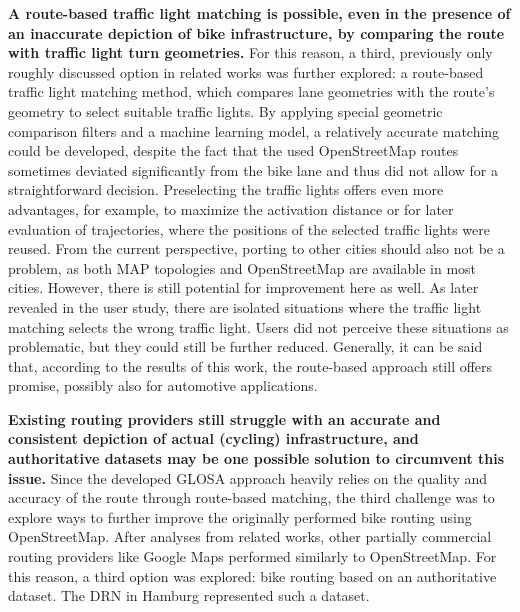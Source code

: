 \textbf{\color{cidarkblue}A route-based traffic light matching is possible, even in the presence of an inaccurate depiction of bike infrastructure, by comparing the route with traffic light turn geometries.} For this reason, a third, previously only roughly discussed option in related works was further explored: a route-based traffic light matching method, which compares lane geometries with the route's geometry to select suitable traffic lights. By applying special geometric comparison filters and a machine learning model, a relatively accurate matching could be developed, despite the fact that the used OpenStreetMap routes sometimes deviated significantly from the bike lane and thus did not allow for a straightforward decision. Preselecting the traffic lights offers even more advantages, for example, to maximize the activation distance or for later evaluation of trajectories, where the positions of the selected traffic lights were reused. From the current perspective, porting to other cities should also not be a problem, as both MAP topologies and OpenStreetMap are available in most cities. However, there is still potential for improvement here as well. As later revealed in the user study, there are isolated situations where the traffic light matching selects the wrong traffic light. Users did not perceive these situations as problematic, but they could still be further reduced. Generally, it can be said that, according to the results of this work, the route-based approach still offers promise, possibly also for automotive applications.

\textbf{\color{cidarkblue}Existing routing providers still struggle with an accurate and consistent depiction of actual (cycling) infrastructure, and authoritative datasets may be one possible solution to circumvent this issue.} Since the developed GLOSA approach heavily relies on the quality and accuracy of the route through route-based matching, the third challenge was to explore ways to further improve the originally performed bike routing using OpenStreetMap. After analyses from related works, other partially commercial routing providers like Google Maps performed similarly to OpenStreetMap. For this reason, a third option was explored: bike routing based on an authoritative dataset. The DRN in Hamburg represented such a dataset.

